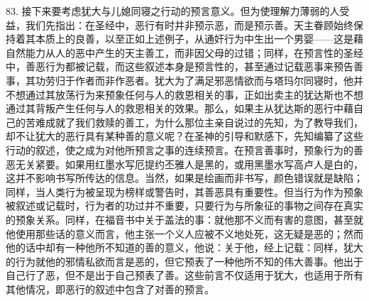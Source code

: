 83. 接下来要考虑犹大与儿媳同寝之行动的预言意义。但为使理解力薄弱的人受益，我们先指出：在圣经中，恶行有时并非预示恶，而是预示善。天主眷顾始终保持着其本质上的良善，以至正如上述例子，从通奸行为中生出一个男婴——这是藉自然能力从人的恶中产生的天主善工，而非因父母的过错；同样，在预言性的圣经中，善恶行为都被记载，而这些叙述本身是预言性的，甚至通过记载恶事来预告善事，其功劳归于作者而非作恶者。犹大为了满足邪恶情欲而与塔玛尔同寝时，他并不想通过其放荡行为来预象任何与人的救恩相关的事，正如出卖主的犹达斯也不想通过其背叛产生任何与人的救恩相关的效果。那么，如果主从犹达斯的恶行中藉自己的苦难成就了我们救赎的善工，为什么那位主亲自说过的先知，为了教导我们，却不让犹大的恶行具有某种善的意义呢？在圣神的引导和默感下，先知编纂了这些行动的叙述，使之成为对他所预言之事的连续预言。在预言善事时，预象行为的善恶无关紧要。如果用红墨水写厄提约丕雅人是黑的，或用黑墨水写高卢人是白的，这并不影响书写所传达的信息。当然，如果是绘画而非书写，颜色错误就是缺陷；同样，当人类行为被呈现为榜样或警告时，其善恶具有重要性。但当行为作为预象被叙述或记载时，行为者的功过并不重要，只要行为与所象征的事物之间存在真实的预象关系。同样，在福音书中关于盖法的事：就他那不义而有害的意图，甚至就他使用那些话的意义而言，他主张一个义人应被不义地处死，这无疑是恶的；然而他的话中却有一种他所不知道的善的意义，他说：关于他，经上记载：同样，犹大的行为就他的邪情私欲而言是恶的，但它预表了一种他所不知的伟大善事。他出于自己行了恶，但不是出于自己预表了善。这些前言不仅适用于犹大，也适用于所有其他情况，即恶行的叙述中包含了对善的预言。\par

